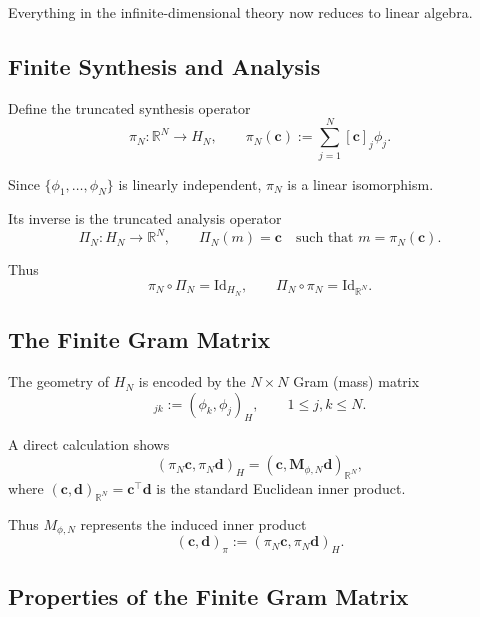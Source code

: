 \documentclass[11pt,twoside,openright]{book}
\theoremstyle{plain}
\theoremstyle{definition}
\theoremstyle{remark}
\begin{document}
Everything in the infinite-dimensional theory now reduces to linear algebra.

\subsection{Finite Synthesis and Analysis}

Define the truncated synthesis operator
\begin{equation}
\pi_N : \mathbb{R}^N \to H_N,
\qquad
\pi_N(\mathbf{c}) := \sum_{j=1}^N [\mathbf{c}]_j \phi_j .
\end{equation}

Since $\{\phi_1,\dots,\phi_N\}$ is linearly independent,
$\pi_N$ is a linear isomorphism.

Its inverse is the truncated analysis operator
\begin{equation}
\Pi_N : H_N \to \mathbb{R}^N,
\qquad
\Pi_N(m) = \mathbf{c} \quad \text{such that } m=\pi_N(\mathbf{c}).
\end{equation}

Thus
\begin{equation}
\pi_N \circ \Pi_N = \mathrm{Id}_{H_N},
\qquad
\Pi_N \circ \pi_N = \mathrm{Id}_{\mathbb{R}^N}.
\end{equation}

\subsection{The Finite Gram Matrix}

The geometry of $H_N$ is encoded by the
$N\times N$ Gram (mass) matrix
\begin{equation}
[\mathbf{M}_{\phi,N}]_{jk}
:=
(\phi_k,\phi_j)_H,
\qquad 1 \le j,k \le N.
\end{equation}

A direct calculation shows
\begin{equation}
(\pi_N \mathbf{c},\pi_N \mathbf{d})_H
=
(\mathbf{c}, \mathbf{M}_{\phi,N} \mathbf{d})_{\mathbb{R}^N},
\end{equation}
where $(\mathbf{c},\mathbf{d})_{\mathbb{R}^N}=\mathbf{c}^\top \mathbf{d}$ is the standard Euclidean inner product.

Thus $M_{\phi,N}$ represents the induced inner product
\[
(\mathbf{c},\mathbf{d})_\pi := (\pi_N \mathbf{c},\pi_N \mathbf{d})_H.
\]

\subsection{Properties of the Finite Gram Matrix}
\end{document}
